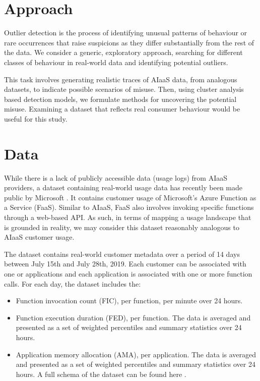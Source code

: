 \documentclass[a4paper,12pt]{report}
\begin{document}
\section{Approach}
Outlier detection is the process of identifying unusual patterns of behaviour or rare occurrences that raise suspicions as they differ substantially from the rest of the data. We consider a generic, exploratory approach, searching for different classes of behaviour in real-world data and identifying potential outliers. 

This task involves generating realistic traces of AIaaS data, from analogous datasets, to 
indicate possible scenarios of misuse. Then, using cluster analysis based detection models, we formulate methods for uncovering the potential misuse. Examining a dataset that reflects real consumer behaviour would be useful for this study.

\section{Data}
While there is a lack of publicly accessible data (usage logs) from AIaaS providers, a dataset containing real-world usage data has recently been made public by Microsoft \cite{shahrad2020serverless}. It contains customer usage of Microsoft’s Azure Function as a Service (FaaS). Similar to AIaaS, FaaS also involves invoking specific functions through a web-based API. As such, in terms of mapping a usage landscape that is grounded in reality, we may consider this dataset reasonably analogous to AIaaS customer usage. 

The dataset contains real-world customer metadata over a period of 14 days between July 15th and July 28th, 2019. Each customer can be associated with one or applications and each application is associated with one or more function calls. For each day, the dataset includes the:
\begin{itemize}
    \item Function invocation count (FIC), per function, per minute over 24 hours.
    \item Function execution duration (FED), per function. The data is averaged and presented as a set of weighted percentiles and summary statistics over 24 hours.
    \item Application memory allocation (AMA), per application. The data is averaged and presented as a set of weighted percentiles and summary statistics over 24 hours.
A full schema of the dataset can be found here \cite{AzurePub78:online}.
\end{itemize}
\end{document}
